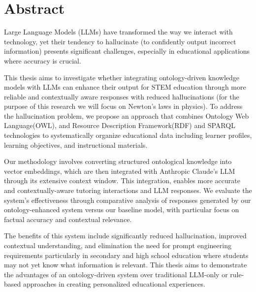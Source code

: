 
\section*{Abstract}

Large Language Models (LLMs) have transformed the way we interact with technology, 
yet their tendency to hallucinate (to confidently output incorrect information) presents significant challenges, especially in educational applications 
where accuracy is crucial.

This thesis aims to investigate whether integrating ontology-driven knowledge models with LLMs can enhance their output for STEM education through more 
reliable and contextually aware responses with reduced hallucinations (for the purpose of this research we will focus on Newton's laws in physics). To address the hallucination problem, we propose an approach that combines Ontology Web Language(OWL), and Resource Description Framework(RDF) and SPARQL technologies
to systematically organize educational data including learner profiles, learning objectives, and instructional materials.

Our methodology involves converting structured ontological knowledge into vector embeddings, which are then integrated with Anthropic Claude's LLM through its extensive context window. 
This integration, enables more accurate and contextually-aware tutoring interactions and LLM responses. We evaluate the system's effectiveness 
through comparative analysis of responses generated by our ontology-enhanced system versus our baseline model, with particular focus on factual accuracy and contextual relevance.

The benefits of this system include significantly reduced hallucination, improved contextual understanding, and elimination the need for prompt engineering requirements particularly in
secondary and high school education where students may not yet know what information is relevant. This thesis aims to demonstrate the advantages of an ontology-driven 
system over traditional LLM-only or rule-based approaches in creating personalized educational experiences.

\newpage